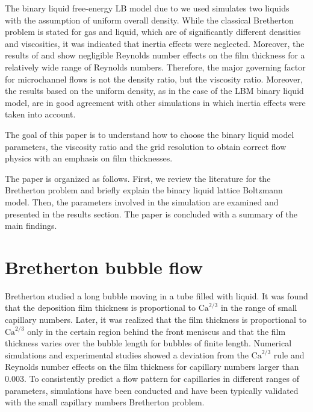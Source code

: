 \documentclass[preprint,12pt]{elsarticle}
\newcommand{\Ca}{\mathrm{Ca}}
\begin{document}
The binary liquid free-energy LB model due to \citet{swift} we used
simulates two liquids with the assumption of uniform overall
density. While the classical Bretherton problem is stated for gas and liquid, which are of
significantly
different densities and viscosities, it was indicated \cite{bretherton} that inertia effects were
neglected. Moreover, the results of \citet{giavedoni-numerical} and \citet{heil-bretherton} show
negligible Reynolds number effects on the film thickness for a relatively wide range of Reynolds
numbers.
Therefore, the major governing factor for microchannel flows is not the density ratio, but the
viscosity ratio. Moreover, the results based on the uniform density, as in the case of the LBM
binary liquid model, are in good agreement with other simulations
\cite{giavedoni-numerical,heil-bretherton} in which inertia effects were taken into account.

The goal of this paper is to understand how to choose the
binary liquid model parameters, the viscosity ratio and the grid
resolution to obtain correct flow physics with an emphasis on film thicknesses.

The paper is organized as follows.  First, we review the literature
for the Bretherton problem and briefly
explain the binary liquid lattice Boltzmann model. Then, the parameters involved in the
simulation are examined and presented in the results section. The paper is
concluded with a summary of the main findings.

\section{Bretherton bubble flow}
Bretherton \cite{bretherton} studied a long bubble
moving in a tube filled with liquid. It was found that the deposition film thickness
is proportional to $\Ca^{2/3}$ in the range of small capillary numbers. Later,
it was realized \cite{wong-films,wong-pressure} that the film thickness
is proportional to $\Ca^{2/3}$ only in the certain region behind the front meniscus and
that the film thickness
varies over the bubble length for bubbles of finite length. Numerical
simulations \cite{giavedoni-numerical} and experimental studies
\cite{kreutzer-pressure-drop} showed a deviation from the $\Ca^{2/3}$ rule and Reynolds number 
effects on the film thickness for capillary numbers larger than $0.003$.
To consistently  predict a flow pattern for capillaries in
different ranges of parameters, simulations have been conducted and have been typically validated with the
small capillary numbers Bretherton problem.
\end{document}
